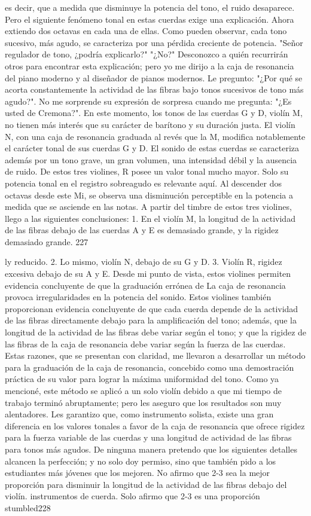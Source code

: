 es decir, que a medida que disminuye la potencia del tono, el ruido desaparece. Pero el siguiente fenómeno tonal en estas cuerdas exige una explicación. Ahora extiendo dos octavas en cada una de ellas. Como pueden observar, cada tono sucesivo, más agudo, se caracteriza por una pérdida creciente de potencia.
"Señor regulador de tono, ¿podría explicarlo?"
"¿No?"
Desconozco a quién recurrirán otros para encontrar esta explicación; pero yo me dirijo a la caja de resonancia del piano moderno y al diseñador de pianos modernos. Le pregunto: "¿Por qué se acorta constantemente la actividad de las fibras bajo tonos sucesivos de tono más agudo?". No me sorprende su expresión de sorpresa cuando me pregunta: "¿Es usted de Cremona?".
En este momento, los tonos de las cuerdas G y D, violín M, no tienen más interés que su carácter de barítono y su duración justa.
El violín N, con una caja de resonancia graduada al revés que la M, modifica notablemente el carácter tonal de sus cuerdas G y D. El sonido de estas cuerdas se caracteriza además por un tono grave, un gran volumen, una intensidad débil y la ausencia de ruido.
De estos tres violines, R posee un valor tonal mucho mayor. Solo su potencia tonal en el registro sobreagudo es relevante aquí. Al descender dos octavas desde este Mi, se observa una disminución perceptible en la potencia a medida que se asciende en las notas. A partir del timbre de estos tres violines, llego a las siguientes conclusiones:
1. En el violín M, la longitud de la actividad de las fibras debajo de las cuerdas A y E es demasiado grande, y la rigidez demasiado grande.
227

ly reducido.
2. Lo mismo, violín N, debajo de su G y D.
3. Violín R, rigidez excesiva debajo de su A y
E. Desde mi punto de vista, estos violines permiten
evidencia concluyente de que la graduación errónea de
La caja de resonancia provoca irregularidades en la potencia del sonido.
Estos violines también proporcionan evidencia concluyente de que cada cuerda depende de la actividad de las fibras directamente debajo para la amplificación del tono; además, que la longitud de la actividad de las fibras debe variar según el tono; y que la rigidez de las fibras de la caja de resonancia debe variar según la fuerza de las cuerdas. Estas razones, que se presentan con claridad, me llevaron a desarrollar un método para la graduación de la caja de resonancia, concebido como una demostración práctica de su valor para lograr la máxima uniformidad del tono. Como ya mencioné, este método se aplicó a un solo violín debido a que mi tiempo de trabajo terminó abruptamente; pero les aseguro que los resultados son muy alentadores. Les garantizo que, como instrumento solista, existe una gran diferencia en los valores tonales a favor de la caja de resonancia que ofrece rigidez para la fuerza variable de las cuerdas y una longitud de actividad de las fibras para tonos más agudos.
De ninguna manera pretendo que los siguientes detalles alcancen la perfección; y no solo doy permiso, sino que también pido a los estudiantes más jóvenes que los mejoren. No afirmo que 2-3 sea la mejor proporción para disminuir la longitud de la actividad de las fibras debajo del violín.
instrumentos de cuerda.	Solo afirmo que 2-3 es una proporción stumbled228

